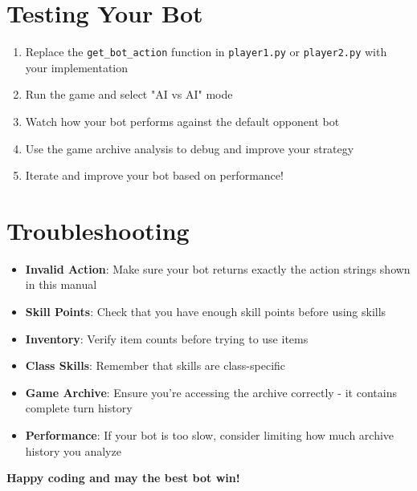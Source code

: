 \documentclass[12pt]{article}
\begin{document}
\section{Testing Your Bot}
\label{sec:testing}

\begin{enumerate}
    \item Replace the \texttt{get\_bot\_action} function in \texttt{player1.py} or \texttt{player2.py} with your implementation
    \item Run the game and select "AI vs AI" mode
    \item Watch how your bot performs against the default opponent bot
    \item Use the game archive analysis to debug and improve your strategy
    \item Iterate and improve your bot based on performance!
\end{enumerate}

\section{Troubleshooting}
\label{sec:troubleshooting}

\begin{itemize}
    \item \textbf{Invalid Action}: Make sure your bot returns exactly the action strings shown in this manual
    \item \textbf{Skill Points}: Check that you have enough skill points before using skills
    \item \textbf{Inventory}: Verify item counts before trying to use items
    \item \textbf{Class Skills}: Remember that skills are class-specific
    \item \textbf{Game Archive}: Ensure you're accessing the archive correctly - it contains complete turn history
    \item \textbf{Performance}: If your bot is too slow, consider limiting how much archive history you analyze
\end{itemize}

\begin{center}
\Large\textbf{Happy coding and may the best bot win!}
\end{center}
\end{document}
